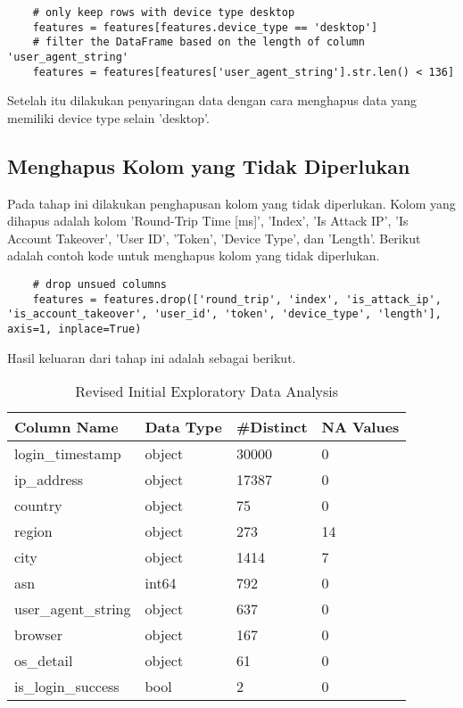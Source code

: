 \begin{lstlisting}
    # only keep rows with device type desktop
    features = features[features.device_type == 'desktop']
    # filter the DataFrame based on the length of column 'user_agent_string'
    features = features[features['user_agent_string'].str.len() < 136]
    \end{lstlisting}

    Setelah itu dilakukan penyaringan data dengan cara menghapus data yang memiliki device type selain 'desktop'.

\subsection{Menghapus Kolom yang Tidak Diperlukan}
Pada tahap ini dilakukan penghapusan kolom yang tidak diperlukan. Kolom yang dihapus adalah kolom 'Round-Trip Time [ms]', 'Index', 'Is Attack IP', 'Is Account Takeover', 'User ID', 'Token', 'Device Type', dan 'Length'. Berikut adalah contoh kode untuk menghapus kolom yang tidak diperlukan.

\begin{lstlisting}
    # drop unsued columns
    features = features.drop(['round_trip', 'index', 'is_attack_ip', 'is_account_takeover', 'user_id', 'token', 'device_type', 'length'], axis=1, inplace=True)
    \end{lstlisting}

Hasil keluaran dari tahap ini adalah sebagai berikut. 

\begin{table}[H]
    \centering
    \begin{tabular}{|l|l|l|l|}
    \hline
    \textbf{Column Name} & \textbf{Data Type} & \textbf{\#Distinct} & \textbf{NA Values} \\ \hline
    login\_timestamp & object & 30000 & 0 \\ 
    ip\_address & object & 17387 & 0 \\ 
    country & object & 75 & 0 \\ 
    region & object & 273 & 14 \\ 
    city & object & 1414 & 7 \\ 
    asn & int64 & 792 & 0 \\ 
    user\_agent\_string & object & 637 & 0 \\ 
    browser & object & 167 & 0 \\ 
    os\_detail & object & 61 & 0 \\ 
    is\_login\_success & bool & 2 & 0 \\ \hline
    \end{tabular}
    \caption{Revised Initial Exploratory Data Analysis}
    \label{tab:revised_initial_eda}
    \end{table}

